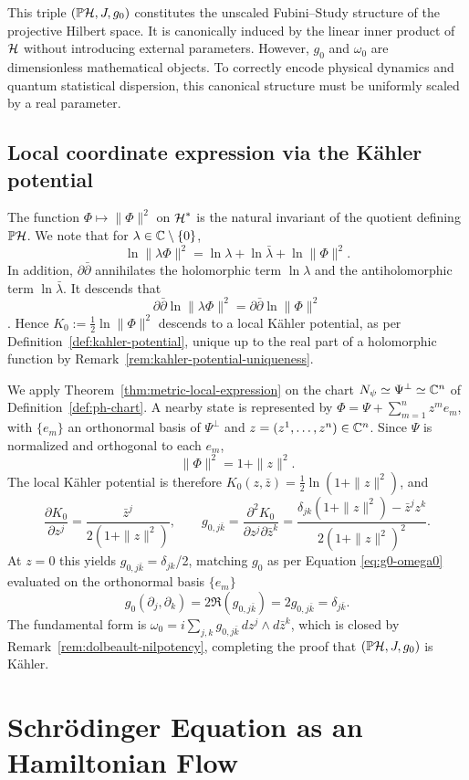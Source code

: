 \noindent This triple $(\PH, J, g_0)$ constitutes the unscaled Fubini--Study structure of the projective Hilbert space. It is canonically induced by the linear inner product of $\H$ without introducing external parameters. However, $g_0$ and $\omega_0$ are dimensionless mathematical objects. To correctly encode physical dynamics and quantum statistical dispersion, this canonical structure must be uniformly scaled by a real parameter.

\subsection*{Local coordinate expression via the Kähler potential}

The function $\Phi\mapsto\|\Phi\|^2$ on $\H^*$ is the natural invariant
of the quotient defining $\PH$. We note that for $\lambda\in\mathbb{C}\setminus\{0\}$,
\[
\ln\|\lambda\Phi\|^2=\ln\lambda+\ln\bar\lambda+\ln\|\Phi\|^2.
\] 
In addition, $\partial\bar\partial$ annihilates the holomorphic term
$\ln\lambda$ and the antiholomorphic term $\ln\bar\lambda$. It descends that $$\partial\bar\partial\ln\|\lambda\Phi\|^2=\partial\bar\partial\ln\|\Phi\|^2$$.
Hence $K_0:=\frac{1}{2}\ln\|\Phi\|^2$ descends to a local Kähler potential, as per
Definition~\ref{def:kahler-potential}, unique up to the real part of a
holomorphic function by Remark~\ref{rem:kahler-potential-uniqueness}.

We apply Theorem~\ref{thm:metric-local-expression} on the chart
$N_\psi\simeq\Psi^\perp\simeq\mathbb{C}^n$ of Definition~\ref{def:ph-chart}. A
nearby state is represented by $\Phi=\Psi+\sum_{m=1}^nz^me_m$, with
$\{e_m\}$ an orthonormal basis of $\Psi^\perp$ and
$z=(z^1,\dots,z^n)\in\mathbb{C}^n$. Since $\Psi$ is normalized and orthogonal
to each $e_m$,
\[
\|\Phi\|^2=1+\|z\|^2.
\]
The local Kähler potential is therefore $K_0(z,\bar z)=\frac{1}{2}\ln(1+\|z\|^2)$,
and
\[
\frac{\partial K_0}{\partial z^j}=\frac{\bar z^j}{2(1+\|z\|^2)}, \qquad
g_{0,j\bar k}=\frac{\partial^2K_0}{\partial z^j\partial\bar z^k}=\frac{\delta_{jk}(1+\|z\|^2)-\bar z^jz^k}{2(1+\|z\|^2)^2}.
\]
At $z=0$ this yields $g_{0,j\bar k}=\delta_{jk}$/2, matching $g_0$ as per Equation \eqref{eq:g0-omega0} evaluated on the orthonormal basis $\{e_m\}$
$$g_0(\partial_j, \partial_k) = 2 \Re{(g_{0,j \bar{k}})} = 2g_{0,j \bar{k}} = \delta_{j \bar{k}}.$$
The fundamental form is $\omega_0=i\sum_{j,k}g_{0,j\bar k}\,dz^j\wedge
d\bar z^k$, which is closed by Remark~\ref{rem:dolbeault-nilpotency},
completing the proof that $(\PH,J,g_0)$ is Kähler.

\section{Schrödinger Equation as an Hamiltonian Flow}
\label{sec:dynamics}

